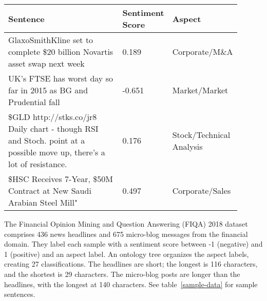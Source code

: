 \renewcommand{\arraystretch}{1.5}
\begin{table*}
    \small
    \caption{Sample FIQA 2018 Data}
    \label{sample-data}
    \centering
    \begin{tabular}{p{0.6\linewidth} | p{0.09\linewidth} | p{0.21\linewidth}}
        \toprule
        Sentence     & Sentiment Score     & Aspect \\
        \midrule
        GlaxoSmithKline set to complete \$20 billion Novartis asset swap next week                                                 & 0.189  & Corporate/M\&A            \\
        UK's FTSE has worst day so far in 2015 as BG and Prudential fall                                                          & -0.651 & Market/Market            \\
        \$GLD http://stks.co/jr8 Daily chart - though RSI and Stoch. point at a possible move up, there's a lot of resistance.     & 0.176  & Stock/Technical Analysis \\
        \$HSC Receives 7-Year, \$50M Contract at New Saudi Arabian Steel Mill"                                                      & 0.497  & Corporate/Sales          \\
        \bottomrule
    \end{tabular}
\end{table*}

The Financial Opinion Mining and Question Answering (FIQA) 2018 dataset~\citep{10.1145/3184558.3192301} comprises 436 news headlines and 675 micro-blog messages from the financial domain.
They label each sample with a sentiment score between -1 (negative) and 1 (positive) and an aspect label.
An ontology tree organizes the aspect labels, creating 27 classifications.
The headlines are short;
the longest is 116 characters, and the shortest is 29 characters.
The micro-blog posts are longer than the headlines, with the longest at 140 characters.
See table~\ref{sample-data} for sample sentences.
